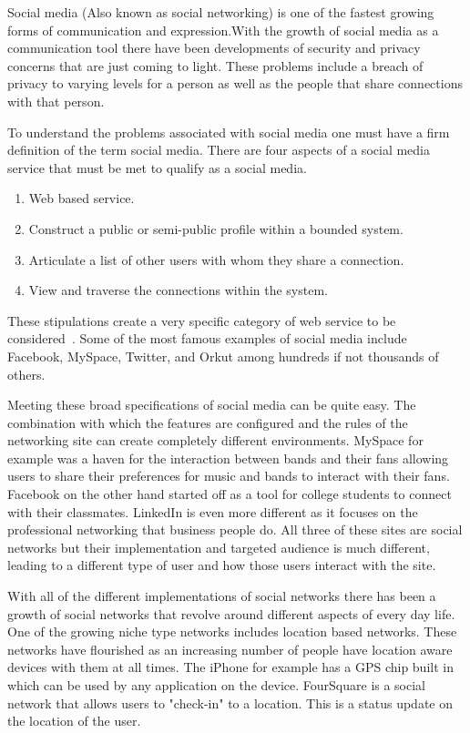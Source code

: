 \maketitle
Social media (Also known as social networking) is one of the fastest growing forms 
of communication and expression.With the growth of social media as a communication 
tool there have been developments of security and privacy concerns that are just
coming to light. These problems include a breach of privacy to varying levels for 
a person as well as the people that share connections with that person.

To understand the problems associated with social media one must have a firm 
definition of the term social media. There are four aspects of a social 
media service that must be met to qualify as a social media.
\begin{enumerate} 
    \item Web based service.  
    \item Construct a public or semi-public profile within a bounded system.  
    \item Articulate a list of other users with whom they share a connection.  
    \item View and traverse the connections within the system.  
\end{enumerate}
These stipulations create a very specific category of web service to be
considered~\cite{boyd2008social}. Some of the most famous examples of social 
media include Facebook, MySpace, Twitter, and Orkut among hundreds if not 
thousands of others.

Meeting these broad specifications of social media can be quite easy. The
combination with which the features are configured and the rules of the
networking site can create completely different environments.
MySpace for example was a haven for the interaction between bands and their fans
allowing users to share their preferences for music and bands to interact with
their fans. Facebook on the other hand started off as a tool for college
students to connect with their classmates. LinkedIn is even more different as it
focuses on the professional networking that business people do. All three of
these sites are social networks but their implementation and targeted audience
is much different, leading to a different type of user and how those users
interact with the site.

With all of the different implementations of social networks there has been a
growth of social networks that revolve around different aspects of every day
life. One of the growing niche type networks includes location based networks.
These networks have flourished as an increasing number of people have location
aware devices with them at all times. The iPhone for example has a GPS chip
built in which can be used by any application on the device. FourSquare is a
social network that allows users to "check-in" to a location. This is a status
update on the location of the user.

